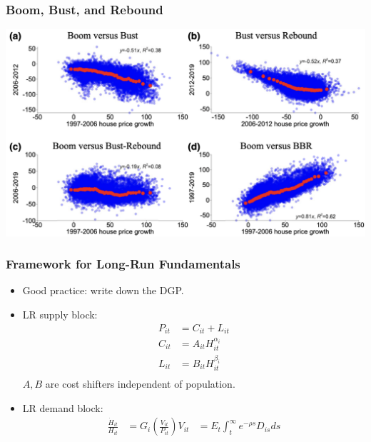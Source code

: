 \documentclass[english,xcolor=svgnames]{beamer}
\begin{document}
\begin{frame}
	\frametitle[alignment=center]{Boom, Bust, and Rebound}
	\centering
	\includegraphics[scale=0.4]{figures/CGMFIG2.png}
\end{frame}

\begin{frame}
	\frametitle[alignment=center]{Framework for Long-Run Fundamentals}
	\begin{itemize}
		\item Good practice: write down the DGP.
		\item LR supply block:
		\begin{align*}
			P_{it} &= C_{it} + L_{it} \\
			C_{it} &= A_{it} H_{it}^{\alpha_i} \\
			L_{it} &= B_{it} H_{it}^{\beta_i} \\
		\end{align*}
		$A,B$ are cost shifters independent of population.
		\item LR demand block:
		\begin{align*}
			\frac{\dot{H}_{it}}{H_{it}} &= G_i \left(\frac{V_{it}}{P_{it}}\right)
			V_{it} &= E_t \int_t^\infty e^{-\rho s} D_{is}ds
		\end{align*}
	\end{itemize}
\end{frame}
\end{document}
